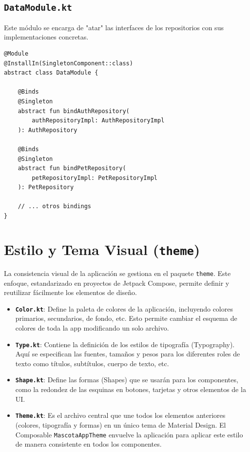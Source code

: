 \documentclass[12pt, a4paper]{article}
\begin{document}
\subsection{\texttt{DataModule.kt}}
Este módulo se encarga de "atar" las interfaces de los repositorios con sus implementaciones concretas.

\begin{lstlisting}[caption={Ejemplo de DataModule.kt con Hilt}, label={lst:data_module}]
@Module
@InstallIn(SingletonComponent::class)
abstract class DataModule {

    @Binds
    @Singleton
    abstract fun bindAuthRepository(
        authRepositoryImpl: AuthRepositoryImpl
    ): AuthRepository

    @Binds
    @Singleton
    abstract fun bindPetRepository(
        petRepositoryImpl: PetRepositoryImpl
    ): PetRepository
        
    // ... otros bindings
}
\end{lstlisting}

\newpage

\section{Estilo y Tema Visual (\texttt{theme})}
La consistencia visual de la aplicación se gestiona en el paquete \texttt{theme}. Este enfoque, estandarizado en proyectos de Jetpack Compose, permite definir y reutilizar fácilmente los elementos de diseño.

\begin{itemize}
    \item \textbf{\texttt{Color.kt}}: Define la paleta de colores de la aplicación, incluyendo colores primarios, secundarios, de fondo, etc. Esto permite cambiar el esquema de colores de toda la app modificando un solo archivo.
    
    \item \textbf{\texttt{Type.kt}}: Contiene la definición de los estilos de tipografía (Typography). Aquí se especifican las fuentes, tamaños y pesos para los diferentes roles de texto como títulos, subtítulos, cuerpo de texto, etc.
    
    \item \textbf{\texttt{Shape.kt}}: Define las formas (Shapes) que se usarán para los componentes, como la redondez de las esquinas en botones, tarjetas y otros elementos de la UI.
    
    \item \textbf{\texttt{Theme.kt}}: Es el archivo central que une todos los elementos anteriores (colores, tipografía y formas) en un único tema de Material Design. El Composable \texttt{MascotaAppTheme} envuelve la aplicación para aplicar este estilo de manera consistente en todos los componentes.
\end{itemize}
\end{document}
